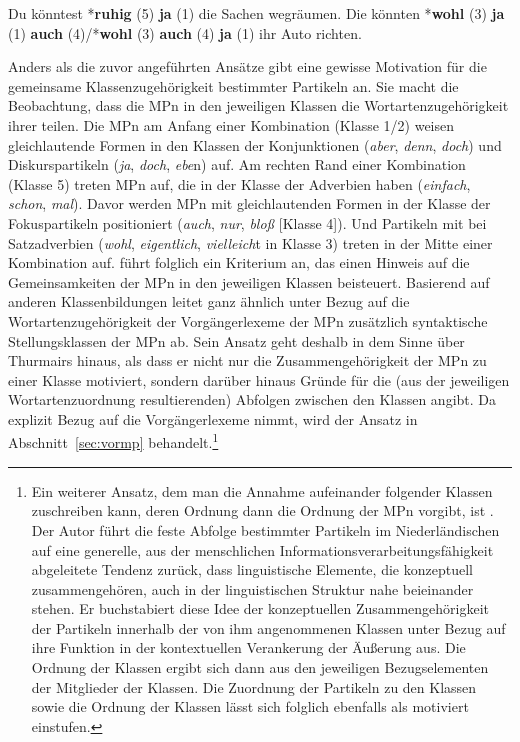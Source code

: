 \begin{exe}
	\ex\label{29} 
		\begin{xlist}	
			\ex\label{29a} Du könntest *\textbf{ruhig} (5) \textbf{ja} (1) die Sachen wegräumen.
			\ex\label{29b} Die könnten *\textbf{wohl} (3) \textbf{ja} (1) \textbf{auch} (4)/*\textbf{wohl} (3) \textbf{auch} (4) \textbf{ja} (1) ihr Auto 				richten.		
	\hfill\hbox{\citet[29]{Thurmair1991}}	
	\end{xlist}
\end{exe}
Anders als die zuvor angeführten Ansätze gibt \citet{Thurmair1991} eine gewisse Motivation für die gemeinsame Klassenzugehörigkeit bestimmter Partikeln an. Sie macht die Beobachtung, dass die MPn in den jeweiligen Klassen die Wortartenzugehörigkeit ihrer  teilen. Die MPn am Anfang einer Kombination (Klasse 1/2) weisen gleichlautende Formen in den Klassen der Konjunktionen (\textit{aber}, \textit{denn}, \textit{doch}) und Diskurspartikeln (\textit{ja}, \textit{doch}, \textit{ebe}n) auf. Am rechten Rand einer Kombination (Klasse 5) treten MPn auf, die  in der Klasse der Adverbien haben (\textit{einfach}, \textit{schon}, \textit{mal}). Davor werden MPn mit gleichlautenden Formen in der Klasse der Fokuspartikeln positioniert (\textit{auch}, \textit{nur}, \textit{bloß} [Klasse 4]). Und Partikeln mit  bei Satzadverbien (\textit{wohl}, \textit{eigentlich}, \textit{vielleich}t in Klasse 3) treten in der Mitte einer Kombination auf. \citet{Thurmair1991} führt folg\-lich ein Kriterium an, das einen Hinweis auf die Gemeinsamkeiten der MPn in den jeweiligen Klassen beisteuert. Basierend auf anderen Klassenbildungen leitet \citet{Abraham1995} ganz ähnlich unter Bezug auf die Wortartenzugehörigkeit der Vorgängerlexeme der MPn zusätzlich syntaktische Stellungsklassen der MPn ab. Sein Ansatz geht deshalb in dem Sinne über Thurmairs hinaus, als dass er nicht nur die Zusammengehörigkeit der MPn zu einer Klasse motiviert, sondern darüber hinaus Gründe für die (aus der jeweiligen Wortartenzuordnung resultierenden) Abfolgen zwischen den Klassen angibt. Da \citet{Abraham1995} explizit Bezug auf die Vorgängerlexeme nimmt, wird der Ansatz in Abschnitt~\ref{sec:vormp} behandelt.\footnote{Ein weiterer Ansatz, dem man die Annahme aufeinander folgender Klassen zuschreiben kann, deren Ordnung dann die Ordnung der MPn vorgibt, ist \citet[203--206]{Verschueren2003}. Der Autor führt die feste Abfolge bestimmter Partikeln im Niederländischen auf eine generelle, aus der menschlichen Informationsverarbeitungsfähigkeit abgeleitete Tendenz zurück, dass linguistische Elemente, die konzeptuell zusammengehören, auch in der linguistischen Struktur nahe beieinander stehen. Er buchstabiert diese Idee der konzeptuellen Zusammengehörigkeit der Partikeln innerhalb der von ihm angenommenen Klassen unter Bezug auf ihre Funktion in der kontextuellen Verankerung der Äußerung aus. Die Ordnung der Klassen ergibt sich dann aus den jeweiligen Bezugselementen der Mitglieder der Klassen. Die Zuordnung der Partikeln zu den Klassen sowie die Ordnung der Klassen lässt sich folglich ebenfalls als motiviert einstufen.}
